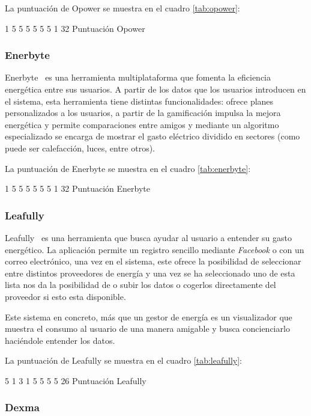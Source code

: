 La puntuación de Opower se muestra en el cuadro \ref{tab:opower}:

\estatArt
{1}
{5}
{5}
{5}
{5}
{5}
{5}
{1}
{32}
{Puntuación Opower \label{tab:opower}}

\subsubsection{Enerbyte}

Enerbyte~\cite{enerbyte} es una herramienta multiplataforma que fomenta la eficiencia energética entre sus usuarios. A partir de los datos que los usuarios introducen en el sistema, esta herramienta tiene distintas funcionalidades: ofrece planes personalizados a los usuarios, a partir de la gamificación impulsa la mejora energética y permite comparaciones entre amigos y mediante un algoritmo especializado se encarga de mostrar el gasto eléctrico dividido en sectores (como puede ser calefacción, luces, entre otros).

La puntuación de Enerbyte se muestra en el cuadro \ref{tab:enerbyte}:

\estatArt
{1}
{5}
{5}
{5}
{5}
{5}
{5}
{1}
{32}
{Puntuación Enerbyte \label{tab:enerbyte}}


\subsubsection{Leafully}

Leafully~\cite{leafully} es una herramienta que busca ayudar al usuario a entender su gasto energético. La aplicación permite un registro sencillo mediante \textit{Facebook} o con un correo electrónico, una vez en el sistema, este ofrece la posibilidad de seleccionar entre distintos proveedores de energía y una vez se ha seleccionado uno de esta lista nos da la posibilidad de o subir los datos o cogerlos directamente del proveedor si esto esta disponible.

Este sistema en concreto, más que un gestor de energía es un visualizador que muestra el consumo al usuario de una manera amigable y busca concienciarlo haciéndole entender los datos.

La puntuación de Leafully se muestra en el cuadro \ref{tab:leafully}:

\estatArt
{5}
{1}
{3}
{1}
{5}
{5}
{5}
{5}
{26}
{Puntuación Leafully \label{tab:leafully}}

\subsubsection{Dexma}

